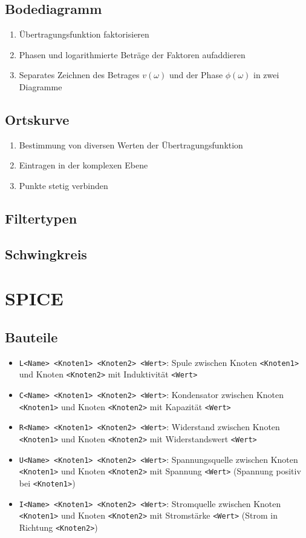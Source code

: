\documentclass[fs, footer]{latex4ei}
\begin{document}
\begin{multicols*}{4}
\subsection{Bodediagramm}
\begin{enumerate}
	\item Übertragungsfunktion faktorisieren
	\item Phasen und logarithmierte Beträge der Faktoren aufaddieren
	\item Separates Zeichnen des Betrages $v(\omega)$ und der Phase $\phi(\omega)$ in zwei Diagramme
\end{enumerate}
\subsection{Ortskurve}
\begin{enumerate}
	\item Bestimmung von diversen Werten der Übertragungsfunktion
	\item Eintragen in der komplexen Ebene
	\item Punkte stetig verbinden
\end{enumerate}
\subsection{Filtertypen}
\subsection{Schwingkreis}
\section{SPICE}
\renewcommand{\t}{\texttt}
\subsection{Bauteile}
\begin{itemize}
	\item \t{L<Name> <Knoten1> <Knoten2> <Wert>}: Spule zwischen Knoten \t{<Knoten1>} und Knoten \t{<Knoten2>} mit Induktivität \t{<Wert>}
	\item \t{C<Name> <Knoten1> <Knoten2> <Wert>}: Kondensator zwischen Knoten \t{<Knoten1>} und Knoten \t{<Knoten2>} mit Kapazität \t{<Wert>}
	\item \t{R<Name> <Knoten1> <Knoten2> <Wert>}: Widerstand zwischen Knoten \t{<Knoten1>} und Knoten \t{<Knoten2>} mit Widerstandswert \t{<Wert>}
	\item \t{U<Name> <Knoten1> <Knoten2> <Wert>}: Spannungsquelle zwischen Knoten \t{<Knoten1>} und Knoten \t{<Knoten2>} mit Spannung \t{<Wert>} (Spannung positiv bei \t{<Knoten1>})
	\item \t{I<Name> <Knoten1> <Knoten2> <Wert>}: Stromquelle zwischen Knoten \t{<Knoten1>} und Knoten \t{<Knoten2>} mit Stromstärke \t{<Wert>} (Strom in Richtung \t{<Knoten2>})
\end{itemize}

\end{multicols*}
\end{document}
